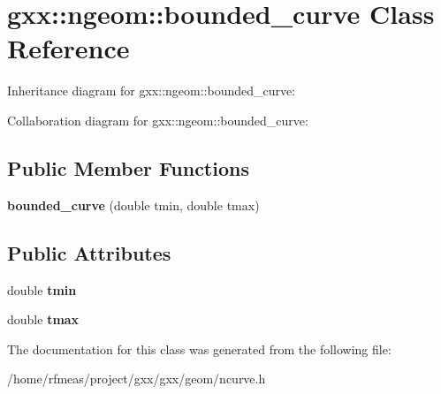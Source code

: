 \hypertarget{classgxx_1_1ngeom_1_1bounded__curve}{}\section{gxx\+:\+:ngeom\+:\+:bounded\+\_\+curve Class Reference}
\label{classgxx_1_1ngeom_1_1bounded__curve}


Inheritance diagram for gxx\+:\+:ngeom\+:\+:bounded\+\_\+curve\+:


Collaboration diagram for gxx\+:\+:ngeom\+:\+:bounded\+\_\+curve\+:
\subsection*{Public Member Functions}
\begin{DoxyCompactItemize}
\item 
{\bfseries bounded\+\_\+curve} (double tmin, double tmax)\hypertarget{classgxx_1_1ngeom_1_1bounded__curve_a84ea6de9c1c738bad9192193b7819861}{}\label{classgxx_1_1ngeom_1_1bounded__curve_a84ea6de9c1c738bad9192193b7819861}

\end{DoxyCompactItemize}
\subsection*{Public Attributes}
\begin{DoxyCompactItemize}
\item 
double {\bfseries tmin}\hypertarget{classgxx_1_1ngeom_1_1bounded__curve_aba2a3d39bcd4779265f6fca5a2e51643}{}\label{classgxx_1_1ngeom_1_1bounded__curve_aba2a3d39bcd4779265f6fca5a2e51643}

\item 
double {\bfseries tmax}\hypertarget{classgxx_1_1ngeom_1_1bounded__curve_a2708098aec43031f7c4e697c9fba3e76}{}\label{classgxx_1_1ngeom_1_1bounded__curve_a2708098aec43031f7c4e697c9fba3e76}

\end{DoxyCompactItemize}


The documentation for this class was generated from the following file\+:\begin{DoxyCompactItemize}
\item 
/home/rfmeas/project/gxx/gxx/geom/ncurve.\+h\end{DoxyCompactItemize}

